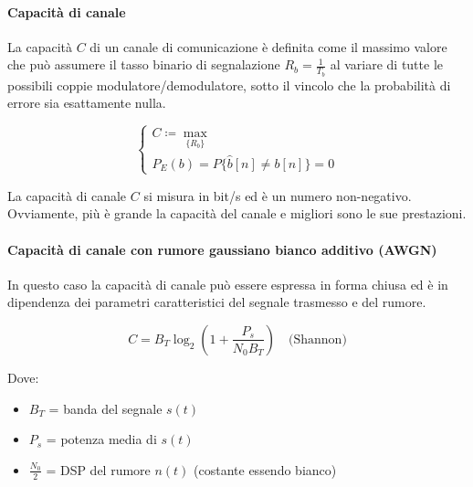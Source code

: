 \paragraph*{Capacità di canale}

La capacità \( C \) di un canale di comunicazione è definita come il massimo valore che può assumere il tasso binario di segnalazione \( R_b = \frac{1}{T_b} \) al variare di tutte le possibili coppie modulatore/demodulatore, sotto il vincolo che la probabilità di errore sia esattamente nulla.


\[
    \begin{cases} 
        C \coloneqq \max_{\{R_b\}} \\
        P_E(b) = P\{\hat{b}[n] \neq b[n]\} = 0
    \end{cases}
\]

La capacità di canale \( C \) si misura in bit/s ed è un numero non-negativo. Ovviamente, più è grande la capacità del canale e migliori sono le sue prestazioni.

\paragraph*{Capacità di canale con rumore gaussiano bianco additivo (AWGN)}

\begin{center}
\end{center}

In questo caso la capacità di canale può essere espressa in forma chiusa ed è in dipendenza dei parametri caratteristici del segnale trasmesso e del rumore.

\[
C = B_T \log_2 \left( 1 + \frac{P_s}{N_0 B_T} \right) \quad \text{(Shannon)}
\]

Dove:
\begin{itemize}
  \item \( B_T \) = banda del segnale \( s(t) \)
  \item \( P_s \) = potenza media di \( s(t) \)
  \item \( \frac{N_0}{2} \) = DSP del rumore \( n(t) \) (costante essendo bianco)
\end{itemize}

